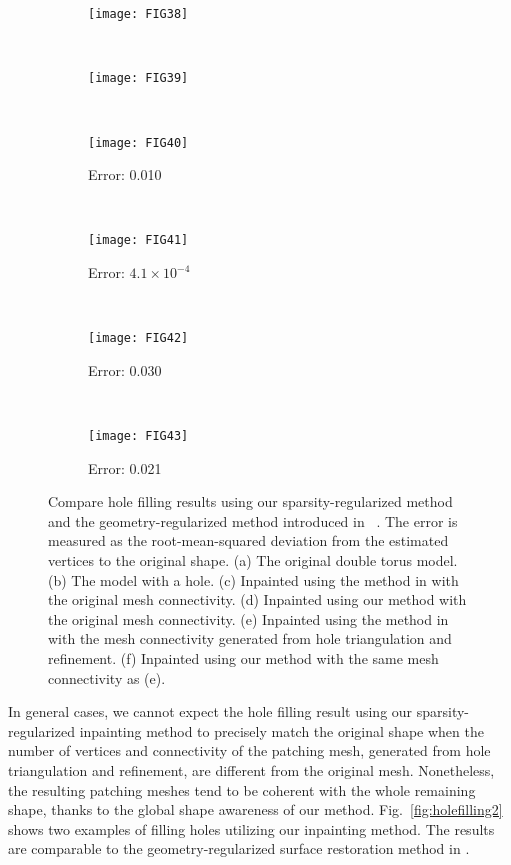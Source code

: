\begin{figure}
\centering
    \begin{subfigure}[b]{0.3\linewidth}
    \texttt{[image: FIG38]}
    \caption{}
    \end{subfigure}
    ~
    \begin{subfigure}[b]{0.3\linewidth}
    \texttt{[image: FIG39]}
    \caption{}
    \end{subfigure}
    ~
    \begin{subfigure}[b]{0.3\linewidth}
    \texttt{[image: FIG40]}
    \caption{Error: 0.010}
    \end{subfigure}
    \\
    \begin{subfigure}[b]{0.3\linewidth}
    \texttt{[image: FIG41]}
    \caption{Error: $4.1\times 10^{-4}$}
    \end{subfigure}
    ~
    \begin{subfigure}[b]{0.3\linewidth}
    \texttt{[image: FIG42]}
    \caption{Error: 0.030}
    \end{subfigure}
    ~
    \begin{subfigure}[b]{0.3\linewidth}
    \texttt{[image: FIG43]}
    \caption{Error: 0.021}
    \end{subfigure}
\caption[Comparison of hole filling results using sparsity-regularized method and geometry-regularized method.]
        {Compare hole filling results using our sparsity-regularized method and the geometry-regularized method introduced in ~\cite{Bac2008}.
        The error is measured as the root-mean-squared deviation from the estimated vertices to the original shape.
        (a) The original double torus model.
        (b) The model with a hole.
        (c) Inpainted using the method in \cite{Bac2008} with the original mesh connectivity.
        (d) Inpainted using our method with the original mesh connectivity.
        (e) Inpainted using the method in \cite{Bac2008} with the mesh connectivity generated from hole triangulation and refinement.
        (f) Inpainted using our method with the same mesh connectivity as (e).}

\label{fig:holefilling1}
\end{figure}

In general cases, we cannot expect the hole filling result using our
sparsity-regularized inpainting method to precisely match the original shape
when the number of vertices and connectivity of the patching mesh, generated
from hole triangulation and refinement, are different from the original mesh.
Nonetheless, the resulting patching meshes tend to be coherent with the whole
remaining shape, thanks to the global shape awareness of our method.
Fig.~\ref{fig:holefilling2} shows two examples of filling holes utilizing our
inpainting method. The results are comparable to the geometry-regularized
surface restoration method in \cite{Bac2008}.

